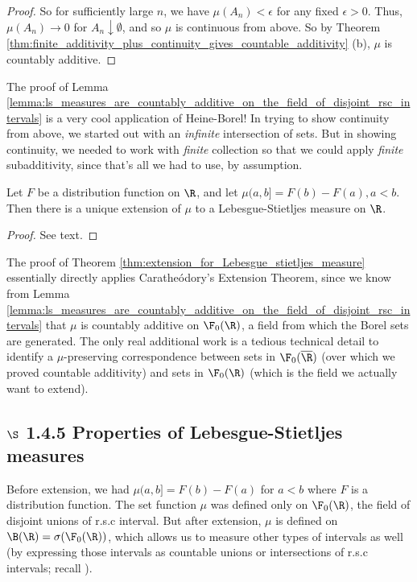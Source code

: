 \documentclass{article} %
\begin{document}
\begin{proof}
So for sufficiently large $n$, we have $\mu(A_n) < \epsilon$ for any fixed $\epsilon >0$. Thus, $\mu(A_n) \to 0$ for $A_n \downarrow \emptyset$, and so $\mu$ is continuous from above.  So by Theorem \ref{thm:finite_additivity_plus_continuity_gives_countable_additivity} (b), $\mu$ is countably additive.
\end{proof}

\begin{remark}
The proof of Lemma \ref{lemma:ls_measures_are_countably_additive_on_the_field_of_disjoint_rsc_intervals} is a very cool application of Heine-Borel!  In trying to show continuity from above, we started out with an \textit{infinite} intersection of sets.  But in showing continuity, we needed to work with \textit{finite} collection so that we could apply \textit{finite} subadditivity, since that's all we had to use, by assumption. 
\end{remark}

\begin{theorem}
Let $F$ be a distribution function on $\R$, and let $\mu(a,b] = F(b) - F(a), a < b$.  Then there is a unique extension of $\mu$ to a Lebesgue-Stietljes measure on $\R$.
\label{thm:extension_for_Lebesgue_stietljes_measure}
\end{theorem}

\begin{proof}
See text. 	
\end{proof}

\begin{remark}
The proof of Theorem \ref{thm:extension_for_Lebesgue_stietljes_measure}
essentially directly applies Carathe\'odory's Extension Theorem, since we know from Lemma \ref{lemma:ls_measures_are_countably_additive_on_the_field_of_disjoint_rsc_intervals} that $\mu$ is countably additive on $\F_0(\R)$, a field from which the Borel sets are generated.  The only real additional work is a tedious technical detail to identify a $\mu$-preserving correspondence between sets in $\F_0(\overline{\R})$ (over which we proved countable additivity) and sets in $\F_0(\R)$ (which is the field we actually want to extend).
\end{remark}

  \subsection{$\S$ 1.4.5 Properties of Lebesgue-Stietljes measures}
 Before extension, we had $\mu(a,b] =F(b) - F(a)$ for $a < b$ where $F$ is a distribution function. The set function $\mu$ was defined only on $\F_0(\R)$, the field of disjoint unions of r.s.c interval.  But after extension, $\mu$ is defined on $\B(\R) = \sigma(\F_0(\R))$, which allows us to measure other types of intervals as well (by expressing those intervals as countable unions or intersections of r.s.c intervals; recall ).
 
\end{document}
